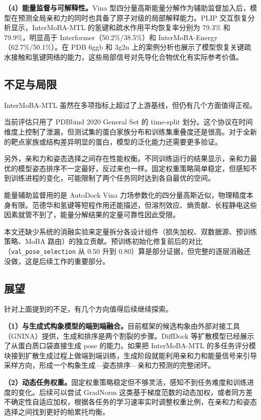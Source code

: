 \textbf{（4）能量监督与可解释性。}Vina 型四分量高斯能量分解作为辅助监督加入后，模型在预测全局亲和力的同时也具备了原子对级的局部解释能力。PLIP 交互恢复分析显示，InterMoBA-MTL 的氢键和疏水作用平均恢复率分别为 79.3\% 和 79.9\%，明显高于 Interformer（50.2\%/38.5\%）和 InterMoBA-Energy（62.7\%/50.1\%）。在 PDB 6ggb 和 3g2n 上的案例分析也展示了模型恢复关键疏水接触和氢键网络的能力，这些局部信号对先导化合物优化有实际参考价值。

\subsection{不足与局限}

InterMoBA-MTL 虽然在多项指标上超过了上游基线，但仍有几个方面值得正视。

当前评估只用了 PDBbind 2020 General Set 的 time-split 划分。这个协议在时间维度上控制了泄漏，但测试集的蛋白家族分布和训练集重叠度还是很高。对于全新的靶点家族或结构差异明显的蛋白，模型的泛化能力还需要更多验证。

另外，亲和力和姿态选择之间存在性能权衡。不同训练运行的结果显示，亲和力最优的模型姿态排序不一定最好，反过来也一样。固定权重策略简单稳定，但感知不到训练进程的变化，可能限制了两个任务同时达到各自最优的空间。

能量辅助监督用的是 AutoDock Vina 力场参数化的四分量高斯近似，物理精度本身有限。范德华和氢键等短程作用还能描述，但溶剂效应、熵贡献、长程静电这些因素就管不到了，能量分解结果的定量可靠性因此受限。

本文还缺少系统的消融实验来定量拆分各设计组件（损失加权、双数据源、预训练策略、MoBA 路由）的独立贡献。预训练初始化修复前后的对比（\texttt{val\_pose\_selection} 从 0.50 升到 0.80）算是部分证据，但完整的逐层消融还没做，这是后续工作的重要部分。

\subsection{展望}

针对上面提到的不足，有几个方向值得后续继续探索。

\textbf{（1）与生成式构象模型的端到端融合。}目前框架的候选构象由外部对接工具（GNINA）提供，生成和排序是两个割裂的步骤。DiffDock\cite{corso2023diffdock} 等扩散模型已经展示了从蛋白质口袋直接生成 pose 的能力。如果把 InterMoBA-MTL 的多任务评分模块接到扩散生成过程上做端到端训练，生成阶段就能利用亲和力和能量信号来引导采样方向，形成一个构象生成—姿态排序—亲和力预测的完整闭环。

\textbf{（2）动态任务权重。}固定权重策略稳定但不够灵活，感知不到任务难度和训练进度的变化。后续可以尝试 GradNorm\cite{chen2018gradnorm} 这类基于梯度范数的动态加权，或者同方差不确定性自适应加权\cite{kendall2018multi}，根据各任务的学习速率实时调整权重比例，在亲和力和姿态选择之间找到更好的帕累托均衡。

